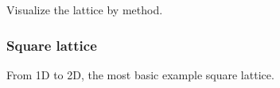 \documentclass[letterpaper,10pt,english]{sphinxmanual}
\begin{document}
Visualize the lattice by  method.

\begin{figure}[htbp]
\centering

\noindent{}
\end{figure}


\subsubsection{Square lattice}
\label{\detokenize{user_model_system:square-lattice}}
From 1D to 2D, the most basic example square lattice.

\def\sphinxLiteralBlockLabel{\label{\detokenize{user_model_system:id3}}}
%
\end{document}
